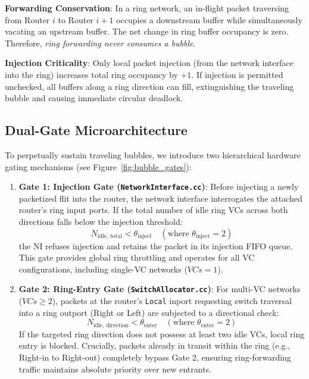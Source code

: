 \documentclass[10pt,journal,compsoc]{IEEEtran}
\begin{document}
\textbf{Forwarding Conservation}: In a ring network, an in-flight packet traversing from Router $i$ to Router $i+1$ occupies a downstream buffer while simultaneously vacating an upstream buffer. The net change in ring buffer occupancy is zero. Therefore, \textit{ring forwarding never consumes a bubble}. 

\textbf{Injection Criticality}: Only local packet injection (from the network interface into the ring) increases total ring occupancy by $+1$. If injection is permitted unchecked, all buffers along a ring direction can fill, extinguishing the traveling bubble and causing immediate circular deadlock.

\subsection{Dual-Gate Microarchitecture}
To perpetually sustain traveling bubbles, we introduce two hierarchical hardware gating mechanisms (see Figure~\ref{fig:bubble_gates}):

\begin{enumerate}
    \item \textbf{Gate 1: Injection Gate (\texttt{NetworkInterface.cc})}:
    Before injecting a newly packetized flit into the router, the network interface interrogates the attached router's ring input ports. If the total number of idle ring VCs across both directions falls below the injection threshold:
    \begin{equation}
    N_{\text{idle, total}} < \theta_{\text{inject}} \quad (\text{where } \theta_{\text{inject}} = 2)
    \end{equation}
    the NI refuses injection and retains the packet in its injection FIFO queue. This gate provides global ring throttling and operates for all VC configurations, including single-VC networks ($VCs=1$).

    \item \textbf{Gate 2: Ring-Entry Gate (\texttt{SwitchAllocator.cc})}:
    For multi-VC networks ($VCs \ge 2$), packets at the router's \texttt{Local} inport requesting switch traversal into a ring outport (Right or Left) are subjected to a directional check:
    \begin{equation}
    N_{\text{idle, direction}} < \theta_{\text{enter}} \quad (\text{where } \theta_{\text{enter}} = 2)
    \end{equation}
    If the targeted ring direction does not possess at least two idle VCs, local ring entry is blocked. Crucially, packets already in transit within the ring (e.g., Right-in to Right-out) completely bypass Gate 2, ensuring ring-forwarding traffic maintains absolute priority over new entrants.
\end{enumerate}
\end{document}
